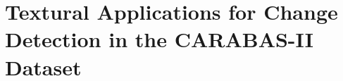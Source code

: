 \documentclass[msc, eng]{ita}    %
\begin{document}
% 

% 

% 

% 

% 

% 

% 

\chapter{Textural Applications for Change Detection in the CARABAS-II Dataset}
\label{cap:cda_chapter}


% 

% 
\end{document}
